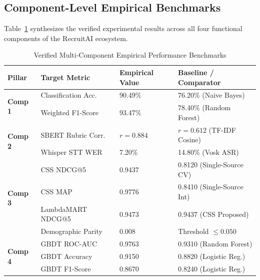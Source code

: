 \documentclass[conference]{IEEEtran}
\begin{document}
\subsection{Component-Level Empirical Benchmarks}
Table~\ref{tab:macro_results} synthesizes the verified experimental results across all four functional components of the RecruitAI ecosystem.

\begin{table}[h]
\centering
\caption{Verified Multi-Component Empirical Performance Benchmarks}
\label{tab:macro_results}
\begin{tabular}{@{}llll@{}}
\toprule
\textbf{Pillar} & \textbf{Target Metric} & \textbf{Empirical Value} & \textbf{Baseline / Comparator} \\
\midrule
\multirow{2}{*}{\textbf{Comp 1}} & Classification Acc. & 90.49\% & 76.20\% (Naive Bayes) \\
                                 & Weighted F1-Score   & 93.47\% & 78.40\% (Random Forest) \\
\midrule
\multirow{2}{*}{\textbf{Comp 2}} & SBERT Rubric Corr.  & $r = 0.884$ & $r = 0.612$ (TF-IDF Cosine) \\
                                 & Whisper STT WER     & 7.20\% & 14.80\% (Vosk ASR) \\
\midrule
\multirow{4}{*}{\textbf{Comp 3}} & CSS NDCG@5          & 0.9437 & 0.8120 (Single-Source CV) \\
                                 & CSS MAP             & 0.9776 & 0.8410 (Single-Source Int) \\
                                 & LambdaMART NDCG@5   & 0.9473 & 0.9437 (CSS Proposed) \\
                                 & Demographic Parity  & 0.008  & Threshold $\le 0.050$ \\
\midrule
\multirow{3}{*}{\textbf{Comp 4}} & GBDT ROC-AUC        & 0.9763 & 0.9310 (Random Forest) \\
                                 & GBDT Accuracy       & 0.9150 & 0.8820 (Logistic Reg.) \\
                                 & GBDT F1-Score       & 0.8670 & 0.8240 (Logistic Reg.) \\
\bottomrule
\end{tabular}
\end{table}
\end{document}
